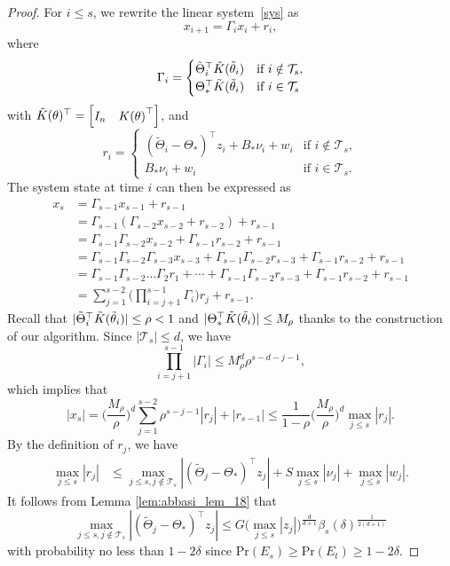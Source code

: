 \documentclass[11pt]{article}
\theoremstyle{plain}
\theoremstyle{definition}
\theoremstyle{remark}
\begin{document}
\begin{proof}
 
For $i \leq s$, we rewrite the linear system~\eqref{sys} as
\[
x_{i+1} = \Gamma_i x_i +r_i,
\]
where
\[
\Gamma_i =
\begin{cases}
\tilde{\Theta}_i^{\top}\tilde{K}(\Tilde{\theta}_i) & \mbox{if }i \notin  \mathcal{T}_s, \\
\Theta_*^{\top}\tilde{K}(\Tilde{\theta}_i) &  \mbox{if }i \in  \mathcal{T}_s
\end{cases}
\]
with $\Tilde{K}(\theta)^{\top} = \begin{bmatrix}
        I_n & {K(\theta)}^{\top} \end{bmatrix}$,
and
\[
r_i = 
\begin{cases}
(\tilde{\Theta}_i-\Theta_*)^{\top}z_i + B_*\nu_i+ w_i &\mbox{if } i \notin {\mathcal{T}_s}, \\
B_*\nu_i+ w_i &\mbox{if } i \in {\mathcal{T}_s.}
\end{cases}
\]
The system state at time $i$ can then be expressed as
\begin{equation*}
\begin{split}
    x_{s} &= \Gamma_{s-1}x_{s-1}+r_{s-1} \\
    &= \Gamma_{s-1}(\Gamma_{s-2}x_{s-2}+r_{s-2})+r_{s-1} \\
    &= \Gamma_{s-1}\Gamma_{s-2}x_{s-2} + \Gamma_{s-1}r_{s-2} + r_{s-1}\\
    & = \Gamma_{s-1}\Gamma_{s-2}\Gamma_{s-3}x_{s-3} +\Gamma_{s-1}\Gamma_{s-2}r_{s-3}+ \Gamma_{s-1}r_{s-2} + r_{s-1}\\
    & = \Gamma_{s-1}\Gamma_{s-2}\ldots\Gamma_2 r_1 + \cdots +\Gamma_{s-1}\Gamma_{s-2}r_{s-3}+\Gamma_{s-1}r_{s-2} + r_{s-1}\\
    & = \sum_{j=1}^{s-2}\bigg(\prod_{i=j+1}^{s-1}\Gamma_i\bigg)r_j + r_{s-1}.
\end{split}
\end{equation*}
Recall that $|\tilde{\Theta}_i^{\top}\tilde{K}(\Tilde{\theta}_i)|\leq \rho<1$ and $|\Theta_*^{\top}\tilde{K}(\Tilde{\theta}_i)| \leq M_{\rho}$ thanks to the construction of our algorithm.
Since $|\mathcal{T}_s|\leq d$,
we have
\[
\prod_{i=j+1}^{s-1}|\Gamma_i| \leq M_{\rho}^{d}\rho^{s-d-j-1},
\]
which implies that 
\[
|x_s| = \bigg(\frac{M_{\rho}}{\rho}\bigg)^d\sum_{j=1}^{s-2}\rho^{s-j-1}|r_{j}|+|r_{s-1}| \leq \frac{1}{1-\rho}\bigg(\frac{M_{\rho}}{\rho}\bigg)^d \max_{j\leq s}|r_j|.
\]
By the definition of $r_j$, we have
\begin{align*}
    \max_{j \leq s}|r_j| &\leq \max_{j \leq s, j \notin \mathcal{T}_s}|(\tilde{\Theta}_j-\Theta_*)^{\top}z_j| + S\max_{j \leq s}|\nu_j| +\max_{j \leq s}|w_j|.
\end{align*}
It follows from   Lemma \ref{lem:abbasi_lem_18} that
\begin{equation*}
    \max_{j\leq s, j\notin \mathcal{T}_s}|(\tilde{\Theta}_j-\Theta_*)^{\top}z_j| \leq G\Big (\max_{j\leq s}|z_j| \Big)^{\frac{d}{d+1}}\beta_{s}(\delta)^{\frac{1}{2(d+1)}}
\end{equation*}
with probability no less than $1-2\delta$ since $\mathrm{Pr}(E_s)\geq \mathrm{Pr}(E_t) \geq 1-2\delta$.



\end{proof}
\end{document}
